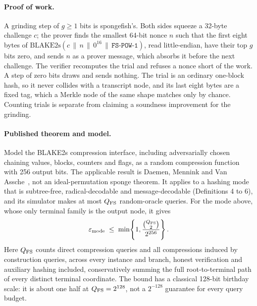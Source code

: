 \paragraph{Proof of work.} A grinding step of $g\ge1$ bits is spongefish's. Both sides squeeze a 32-byte challenge $c$; the prover finds the smallest 64-bit nonce $n$ such that the first eight bytes of $\mathrm{BLAKE2s}(c\,\|\,n\,\|\,0^{16}\,\|\,\texttt{FS-POW-1})$, read little-endian, have their top $g$ bits zero, and sends $n$ as a prover message, which absorbs it before the next challenge. The verifier recomputes the trial and refuses a nonce short of the work. A step of zero bits draws and sends nothing. The trial is an ordinary one-block hash, so it never collides with a transcript node, and its last eight bytes are a fixed tag, which a Merkle node of the same shape matches only by chance. Counting trials is separate from claiming a soundness improvement for the grinding.

\paragraph{Published theorem and model.} Model the BLAKE2s compression interface, including adversarially chosen chaining values, blocks, counters and flags, as a random compression function with 256 output bits. The applicable result is Daemen, Mennink and Van Assche~\cite[Theorem 1, \S4.2]{DMV18}, not an ideal-permutation sponge theorem. It applies to a hashing mode that is subtree-free, radical-decodable and message-decodable (Definitions 4 to 6), and its simulator makes at most $Q_{\mathrm{FS}}$ random-oracle queries. For the mode above, whose only terminal family is the output node, it gives
\[
  \varepsilon_{\mathrm{mode}} \;\le\; \min\!\left\{1,\frac{\binom{Q_{\mathrm{FS}}}{2}}{2^{256}}\right\}.
\]
Here $Q_{\mathrm{FS}}$ counts direct compression queries and all compressions induced by construction queries, across every instance and branch, honest verification and auxiliary hashing included, conservatively summing the full root-to-terminal path of every distinct terminal coordinate. The bound has a classical 128-bit birthday scale: it is about one half at $Q_{\mathrm{FS}}=2^{128}$, not a $2^{-128}$ guarantee for every query budget.

